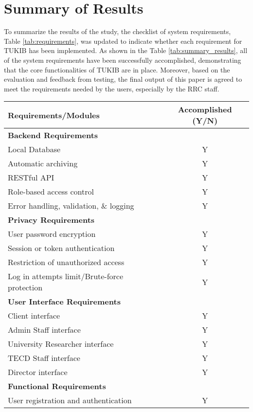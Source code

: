 \section{Summary of Results}

To summarize the results of the study, the checklist of system requirements, Table \ref{tab:requirements}, was updated to indicate whether each requirement for TUKIB has been implemented. As shown in the Table \ref{tab:summary_results}, all of the system requirements have been successfully accomplished, demonstrating that the core functionalities of TUKIB are in place. Moreover, based on the evaluation and feedback from testing, the final output of this paper is agreed to meet the requirements needed by the users, especially by the RRC staff. 

\begin{table}[ht]
	\centering
	\begin{tabular}{|p{10cm}|c|}
		\hline
		\textbf{Requirements/Modules} & \textbf{Accomplished (Y/N)} \\
		\hline
		\multicolumn{2}{|l|}{\textbf{Backend Requirements}} \\
		\hline
		Local Database & Y \\
		Automatic archiving & Y \\
		RESTful API & Y \\
		Role-based access control & Y \\
		Error handling, validation, \& logging & Y \\
		\hline
		\multicolumn{2}{|l|}{\textbf{Privacy Requirements}} \\
		\hline
		User password encryption & Y \\
		Session or token authentication & Y \\
		Restriction of unauthorized access & Y \\
		Log in attempts limit/Brute-force protection & Y \\
		\hline
		\multicolumn{2}{|l|}{\textbf{User Interface Requirements}} \\
		\hline
		Client interface & Y \\
		Admin Staff interface & Y \\
		University Researcher interface & Y \\
		TECD Staff interface & Y \\
		Director interface & Y \\
		\hline
		\multicolumn{2}{|l|}{\textbf{Functional Requirements}} \\
		\hline
		User registration and authentication & Y \\

\end{tabular}
\end{table}
